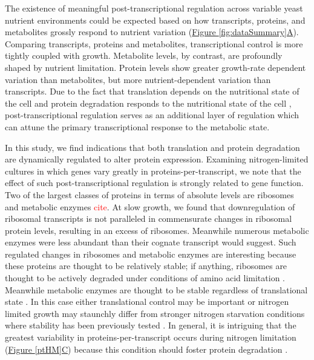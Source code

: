 The existence of meaningful post-transcriptional regulation across variable yeast nutrient environments could be expected based on how transcripts, proteins, and metabolites \cite{Boer:2010fb} grossly respond to nutrient variation (\hyperref[fig:dataSummary]{Figure \ref{fig:dataSummary}A}). Comparing transcripts, proteins and metabolites, transcriptional control is more tightly coupled with growth. Metabolite levels, by contrast, are profoundly shaped by nutrient limitation. Protein levels show greater growth-rate dependent variation than metabolites, but more nutrient-dependent variation than transcripts. Due to the fact that translation depends on the nutritional state of the cell \cite{Klumpp:2009ic} and protein degradation responds to the nutritional state of the cell \cite{Takeshige:1992wm}, post-transcriptional regulation serves as an additional layer of regulation which can attune the primary transcriptional response to the metabolic state.

In this study, we find indications that both translation and protein degradation are dynamically regulated to alter protein expression. Examining nitrogen-limited cultures in which genes vary greatly in proteins-per-transcript, we note that the effect of such post-transcriptional regulation is strongly related to gene function.  Two of the largest classes of proteins in terms of absolute levels are ribosomes and metabolic enzymes \textcolor{red}{cite}. At slow growth, we found that downregulation of ribosomal transcripts is not paralleled in commensurate changes in ribosomal protein levels, resulting in an excess of ribosomes. Meanwhile numerous metabolic enzymes were less abundant than their cognate transcript would suggest. Such regulated changes in ribosomes and metabolic enzymes are interesting because these proteins are thought to be relatively stable; if anything, ribosomes are thought to be actively degraded under conditions of amino acid limitation \cite{Natarajan:2001ke, Washburn:2003ff, Zundel:2009dy}. Meanwhile metabolic enzymes are thought to be stable regardless of translational state \cite{Belle:2006hv}. In this case either translational control may be important or nitrogen limited growth may staunchly differ from stronger nitrogen starvation conditions where stability has been previously tested \cite{Natarajan:2001ke}. In general, it is intriguing that the greatest variability in proteins-per-transcript occurs during nitrogen limitation (\hyperref[ptHM]{Figure \ref{ptHM}C}) because this condition should foster protein degradation \cite{Zundel:2009dy, Xu:2013do}.


